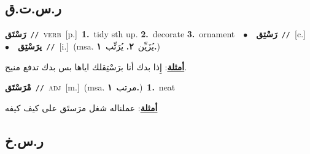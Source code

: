 \documentclass[10pt,a4paper,twoside]{article} %
\begin{document}
\begin{multicols}{2}
\vspace{-3mm}
\subsection*{\color{blue}\foreignlanguage{arabic}{ر.س.ت.ق}\color{blue}{}} 

{\setlength\topsep{0pt}\textbf{\foreignlanguage{arabic}{رَسْتَق}}\ {\color{gray}\texttt{//}\color{black}}\ \textsc{verb}\ [p.]\ \textbf{1.}~tidy sth up.  \textbf{2.}~decorate  \textbf{3.}~ornament\ \ $\bullet$\ \ \setlength\topsep{0pt}\textbf{\foreignlanguage{arabic}{رَسْتِق}}\ {\color{gray}\texttt{//}\color{black}}\ [c.]\ \ $\bullet$\ \ \setlength\topsep{0pt}\textbf{\foreignlanguage{arabic}{يرَسْتِق}}\ {\color{gray}\texttt{//}\color{black}}\ [i.]\ \color{gray}(msa. \foreignlanguage{arabic}{يُزَيِّن}~\foreignlanguage{arabic}{\textbf{٢.}}  \foreignlanguage{arabic}{يُرَتِّب}~\foreignlanguage{arabic}{\textbf{١.}})\color{black}\  \begin{flushright}\color{gray}\foreignlanguage{arabic}{\textbf{\underline{\foreignlanguage{arabic}{أمثلة}}}: إِذا بدك أنا برَسْتِقلك اياها بس بدك تدفع منيح.}\end{flushright}\color{black}} \vspace{2mm}

{\setlength\topsep{0pt}\textbf{\foreignlanguage{arabic}{مْرَسْتَق}}\ {\color{gray}\texttt{//}\color{black}}\ \textsc{adj}\ [m.]\ \color{gray}(msa. \foreignlanguage{arabic}{مرتب}~\foreignlanguage{arabic}{\textbf{١.}})\color{black}\ \textbf{1.}~neat\  \begin{flushright}\color{gray}\foreignlanguage{arabic}{\textbf{\underline{\foreignlanguage{arabic}{أمثلة}}}: عملناله شغل مرَستَق على كيف كيفه}\end{flushright}\color{black}} \vspace{2mm}

\vspace{-3mm}
\subsection*{\color{blue}\foreignlanguage{arabic}{ر.س.خ}\color{blue}{}} 


\end{multicols}
\end{document}

